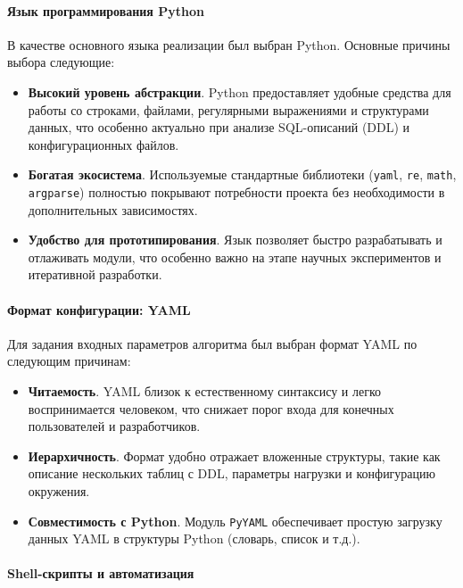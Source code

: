 \paragraph{Язык программирования Python}

В качестве основного языка реализации был выбран Python. Основные причины выбора следующие:

\begin{itemize}
  \item \textbf{Высокий уровень абстракции}. Python предоставляет удобные средства для работы со строками, файлами, регулярными выражениями и структурами данных, что особенно актуально при анализе SQL-описаний (DDL) и конфигурационных файлов.
  \item \textbf{Богатая экосистема}. Используемые стандартные библиотеки (\texttt{yaml}, \texttt{re}, \texttt{math}, \texttt{argparse}) полностью покрывают потребности проекта без необходимости в дополнительных зависимостях.
  \item \textbf{Удобство для прототипирования}. Язык позволяет быстро разрабатывать и отлаживать модули, что особенно важно на этапе научных экспериментов и итеративной разработки.
\end{itemize}

\paragraph{Формат конфигурации: YAML}

Для задания входных параметров алгоритма был выбран формат YAML по следующим причинам:

\begin{itemize}
  \item \textbf{Читаемость}. YAML близок к естественному синтаксису и легко воспринимается человеком, что снижает порог входа для конечных пользователей и разработчиков.
  \item \textbf{Иерархичность}. Формат удобно отражает вложенные структуры, такие как описание нескольких таблиц с DDL, параметры нагрузки и конфигурацию окружения.
  \item \textbf{Совместимость с Python}. Модуль \texttt{PyYAML} обеспечивает простую загрузку данных YAML в структуры Python (словарь, список и т.д.).
\end{itemize}

\paragraph{Shell-скрипты и автоматизация}

